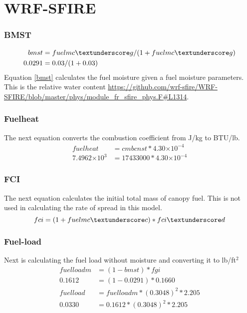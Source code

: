 \documentclass{article}
\newcommand\tenpow[1]{\ensuremath{{\times}10^{#1}}}
\begin{document}
\section{WRF-SFIRE}
\subsubsection{BMST}

\begin{equation}
\label{bmst}
\begin{split}
	bmst &= fuelmc \textunderscore g / (1 + fuelmc \textunderscore g) \\
	0.0291 &= 0.03 / (1 + 0.03)
\end{split}
\end{equation}
Equation \ref{bmst} calculates the fuel moisture given a fuel moisture parameters. This is the relative water content \url{https://github.com/wrf-sfire/WRF-SFIRE/blob/master/phys/module_fr_sfire_phys.F#L1314}.
\\
\subsubsection{Fuelheat}
\noindent The next equation converts the combustion coefficient from J/kg to BTU/lb.
\begin{equation}
	\label{fuelheat}
	\begin{split}
		fuelheat &= cmbcnst * 4.30\tenpow{-4} \\
		7.4962 \tenpow{3} &= 17433000 * 4.30\tenpow{-4}
	\end{split}
\end{equation}

\subsubsection{FCI}
	The next equation calculates the initial total mass of canopy fuel. This is not used in calculating the rate of spread in this model. 
\begin{equation}
	\label{fci}
	fci = (1 + fuelmc \textunderscore c) * fci \textunderscore d
\end{equation}


\subsubsection{Fuel-load}
Next is calculating the fuel load without moisture and converting it to lb/ft$^2$
\begin{equation}
	\label{fuelloadm}
	\begin{split}
		fuelloadm &= (1 - bmst) * fgi \\
		0.1612 &= (1 - 0.0291) * 0.1660 \\
		fuelload &= fuelloadm * (0.3048)^2 * 2.205 \\
		0.0330 &= 0.1612 * (0.3048) ^ 2 * 2.205
	\end{split}
\end{equation}
\end{document}
